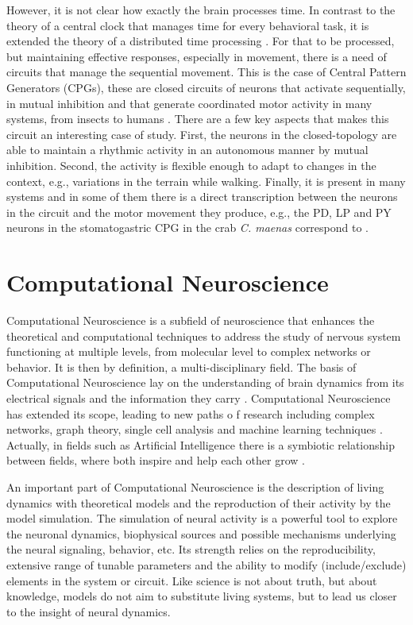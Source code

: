However, it is not clear how exactly the brain processes time. In contrast to the theory of a central clock that manages time for every behavioral task, it is extended the theory of a distributed time processing \parencite{buonomano_temporal_1995,ivry_representation_1996}. For that to be processed, but maintaining effective responses, especially in movement, there is a need of circuits that manage the sequential movement. This is the case of Central Pattern Generators (CPGs), these are closed circuits of neurons that activate sequentially, in mutual inhibition and that generate coordinated motor activity in many systems, from insects to humans \parencite{bibid}. There are a few key aspects that makes this circuit an interesting case of study. First, the neurons in the closed-topology are able to maintain a rhythmic activity in an autonomous manner by mutual inhibition. Second, the activity is flexible enough to adapt to changes in the context, e.g., variations in the terrain while walking. Finally, it is present in many systems and in some of them there is a direct transcription between the neurons in the circuit and the motor movement they produce, e.g., the PD, LP and PY neurons in the stomatogastric CPG in the crab \textit{C. maenas} correspond to .


\section{Computational Neuroscience}
Computational Neuroscience is a subfield of neuroscience that enhances the theoretical and computational techniques to address the study of nervous system functioning at multiple levels, from molecular level to complex networks or behavior. It is then by definition, a multi-disciplinary field. The basis of Computational Neuroscience lay on the understanding of brain dynamics from its electrical signals and the information they carry \parencite{schwiening_brief_2012,catterall_hodgkin-huxley_2012,dimitrov_information_2011,shannon_mathematical_1948}. Computational Neuroscience has extended its scope, leading to new paths o	f research including complex networks, graph theory, single cell analysis and machine learning techniques \parencite{cns2023}. Actually, in fields such as Artificial Intelligence there is a symbiotic relationship between fields, where both inspire and help each other grow \parencite{amunts_human_2019,wozniak_deep_2020,goncalves_training_2020}.

An important part of Computational Neuroscience is the description of living dynamics with theoretical models and the reproduction of their activity by the model simulation. The simulation of neural activity is a powerful tool to explore the neuronal dynamics, biophysical sources and possible mechanisms underlying the neural signaling, behavior, etc. Its strength relies on the reproducibility, extensive range of tunable parameters and the ability to modify (include/exclude) elements in the system or circuit. Like science is not about truth, but about knowledge, models do not aim to substitute living systems, but to lead us closer to the insight of neural dynamics. %

